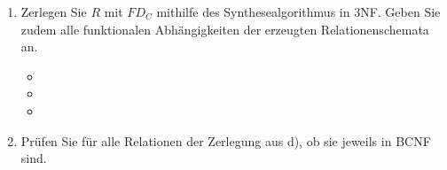 \documentclass{lehramt-informatik-aufgabe}
\begin{document}
\begin{enumerate}
\begin{enumerate}
\begin{liAntwort}
\begin{itemize}
\item {}
\item {}
\end{itemize}
\end{liAntwort}
\end{enumerate}


\item Zerlegen Sie $R$ mit $FD_C$ mithilfe des Synthesealgorithmus in
3NF. Geben Sie zudem alle funktionalen Abhängigkeiten der erzeugten
Relationenschemata an.

\begin{liAntwort}
\begin{itemize}
\item {}
\item {}
\item {}
\end{itemize}
\end{liAntwort}


\item Prüfen Sie für alle Relationen der Zerlegung aus d), ob sie
jeweils in BCNF sind.

\begin{liAntwort}

\end{liAntwort}

\end{enumerate}
\end{document}
